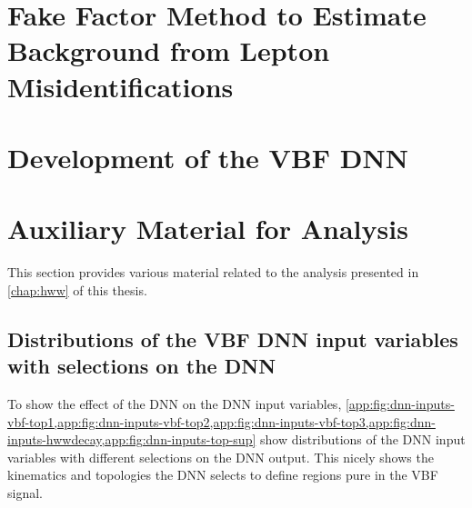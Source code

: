 \chapter[Fake Factor Method]{Fake Factor Method to Estimate Background from Lepton Misidentifications}
\label{app:fake-factor-method}


\FloatBarrier
\chapter{Development of the VBF DNN}
\label{app:chap:DNN}


\FloatBarrier
\chapter{Auxiliary Material for \HWW Analysis}
This section provides various material related to the \HWW analysis presented in \cref{chap:hww} of this thesis.

\clearpage
\FloatBarrier
\section[Distributions of the VBF DNN input variables]{Distributions of the VBF DNN input variables with selections on the DNN}
\label{app:dnn:input-vars}
To show the effect of the DNN on the DNN input variables, \cref{app:fig:dnn-inputs-vbf-top1,app:fig:dnn-inputs-vbf-top2,app:fig:dnn-inputs-vbf-top3,app:fig:dnn-inputs-hwwdecay,app:fig:dnn-inputs-top-sup} show distributions of the DNN input variables with different selections on the DNN output.
This nicely shows the kinematics and topologies the DNN selects to define regions pure in the VBF signal.

